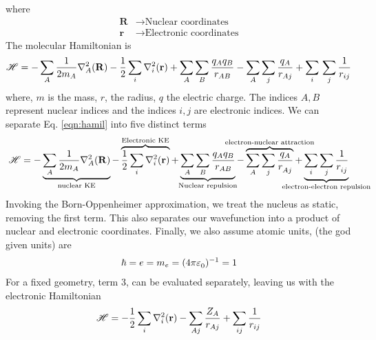 \documentclass[11pt]{article}
\begin{document}
where
\begin{align*}
\mathbf{R}&\to \text{Nuclear coordinates}\\
\mathbf{r}&\to \text{Electronic coordinates}
\end{align*} 
The molecular Hamiltonian is
\begin{equation}\mathscr{H} = - \sum_{A}\frac{1}{2m_{A}}\nabla_A^2 (\mathbf{R}) -\frac{1}{2}\sum_{i}\nabla_i^2 (\mathbf{r}) + \sum_{A}\sum_{B}\frac{q_{A} q_{B}}{r_{AB}}-\sum_{A}\sum_{j}\frac{q_{A}}{r_{Aj}}+\sum_{i}{}\sum_{j}\frac{1}{r_{ij}} \label{eqn:hamil}
\end{equation} 
\noindent where, $m$ is the mass, $r$, the radius, $q$ the electric charge. The indices $A,B$ represent nuclear indices and the indices $i,j$ are electronic indices. 
\noindent We can separate Eq. \ref{eqn:hamil} into five distinct terms
\[\mathscr{H} = - \cunderb{\sum_{A}\frac{1}{2m_{A}}\laplacian_A (\mathbf{R})}{\text{nuclear KE}} 
-\coverb{\frac{1}{2}\sum_{i}\laplacian_i (\mathbf{r})}{\text{Electronic KE}} +
\cunderb{\sum_{A}\sum_{B}\frac{q_{A} q_{B}}{r_{AB}}}{\text{Nuclear repulsion}}
-\coverb{\sum_{A}\sum_{j}\frac{q_{A}}{r_{Aj}^{}}}{\text{electron-nuclear attraction}}
+\cunderb{\sum_{i}\sum_{j}\frac{1}{r_{ij}^{}}}{\text{electron-electron repulsion}}\]
Invoking the Born-Oppenheimer approximation, we treat the nucleus as static, removing the first term. This also separates our wavefunction into a product of nuclear and electronic coordinates. 
\noindent Finally, we also assume atomic units, (the god given units) are
\begin{align*}
\hbar = e = m_e = (4\pi \varepsilon_0^{})^{-1} = 1
\end{align*}
For a fixed geometry, term 3, can be evaluated separately, leaving us with the electronic Hamiltonian 
\begin{equation}\label{eq:elecham}
\mathscr{H} = - \frac{1}{2} \sum_i \laplacian_i (\bb{r}) - \sum_{Aj} \frac{Z_A}{r_{Aj}} + \sum_{ij} \frac{1}{r_{ij}}
\end{equation}
\end{document}
